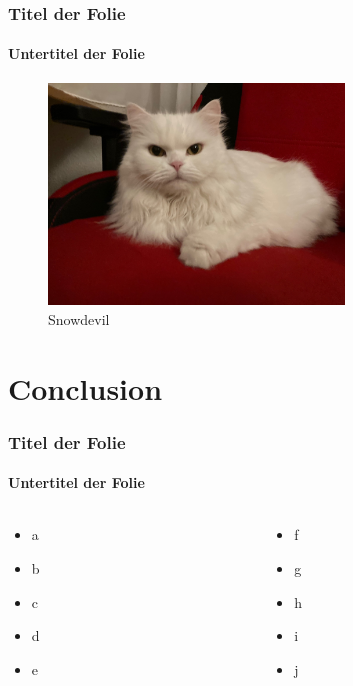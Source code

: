 \begin{frame}
\frametitle{Titel der Folie}
\framesubtitle{Untertitel der Folie}

\begin{figure}
\begin{center}
\includegraphics[width=0.7\textwidth]{./IncludedPictures/Cat}
\caption{Snowdevil}
\end{center}
\end{figure}

\end{frame}

\section{Conclusion}

\begin{frame}
\frametitle{Titel der Folie}
\framesubtitle{Untertitel der Folie}

\begin{columns}
\begin{column}{0.495\textwidth}
\begin{itemize}
\item a
\item b
\item c
\item d
\item e
\end{itemize}
\end{column}
\begin{column}{0.495\textwidth}
\begin{itemize}
\item f
\item g
\item h
\item i
\item j
\end{itemize}
\end{column}
\end{columns}

\end{frame}


